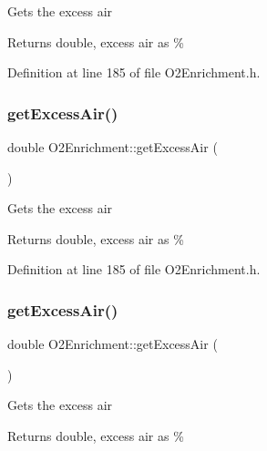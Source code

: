 Gets the excess air \begin{DoxyReturn}{Returns}
double, excess air as \% 
\end{DoxyReturn}


Definition at line 185 of file O2\+Enrichment.\+h.

\mbox{\label{class_o2_enrichment_aba7923d4967cc1258ad6d078822f699a}} 
\subsubsection{\texorpdfstring{get\+Excess\+Air()}{getExcessAir()}\hspace{0.1cm}{\footnotesize\ttfamily [2/3]}}
{\footnotesize\ttfamily double O2\+Enrichment\+::get\+Excess\+Air (\begin{DoxyParamCaption}{ }\end{DoxyParamCaption})\hspace{0.3cm}{\ttfamily [inline]}}

Gets the excess air \begin{DoxyReturn}{Returns}
double, excess air as \% 
\end{DoxyReturn}


Definition at line 185 of file O2\+Enrichment.\+h.

\mbox{\label{class_o2_enrichment_aba7923d4967cc1258ad6d078822f699a}} 
\subsubsection{\texorpdfstring{get\+Excess\+Air()}{getExcessAir()}\hspace{0.1cm}{\footnotesize\ttfamily [3/3]}}
{\footnotesize\ttfamily double O2\+Enrichment\+::get\+Excess\+Air (\begin{DoxyParamCaption}{ }\end{DoxyParamCaption})\hspace{0.3cm}{\ttfamily [inline]}}

Gets the excess air \begin{DoxyReturn}{Returns}
double, excess air as \% 
\end{DoxyReturn}


